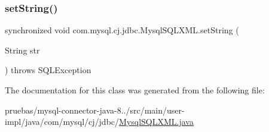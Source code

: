 \mbox{\label{classcom_1_1mysql_1_1cj_1_1jdbc_1_1_mysql_s_q_l_x_m_l_a76ebfa8a2a09d7444e1ed47b85fb74b5}} 
\subsubsection{\texorpdfstring{set\+String()}{setString()}}
{\footnotesize\ttfamily synchronized void com.\+mysql.\+cj.\+jdbc.\+Mysql\+S\+Q\+L\+X\+M\+L.\+set\+String (\begin{DoxyParamCaption}\item[{String}]{str }\end{DoxyParamCaption}) throws S\+Q\+L\+Exception}



The documentation for this class was generated from the following file\+:\begin{DoxyCompactItemize}
\item 
pruebas/mysql-\/connector-\/java-\/8../src/main/user-\/impl/java/com/mysql/cj/jdbc/\mbox{\hyperlink{_mysql_s_q_l_x_m_l_8java}{Mysql\+S\+Q\+L\+X\+M\+L.\+java}}\end{DoxyCompactItemize}
